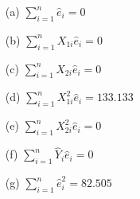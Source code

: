 \begin{itemize}
	\item[(a)] $\sum_{i=1}^n\hat{e}_i = 0$
	\item[(b)] $\sum_{i=1}^nX_{1i}\hat{e}_i = 0$
	\item[(c)] $\sum_{i=1}^nX_{2i}\hat{e}_i = 0$
	\item[(d)] $\sum_{i=1}^nX_{1i}^2\hat{e}_i = 133.133$
	\item[(e)] $\sum_{i=1}^nX_{2i}^2\hat{e}_i = 0$
	\item[(f)] $\sum_{i=1}^n\hat{Y}_i\hat{e}_i = 0$
	\item[(g)] $\sum_{i=1}^n\hat{e}^2_i = 82.505$
\end{itemize}